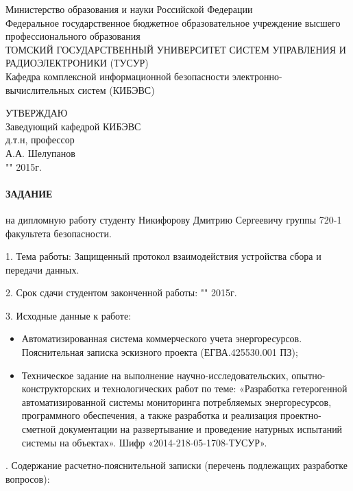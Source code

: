\newpage
{}

\begin{center}
Министерство образования и науки Российской Федерации\\
Федеральное государственное бюджетное образовательное учреждение высшего профессионального образования\\
ТОМСКИЙ ГОСУДАРСТВЕННЫЙ УНИВЕРСИТЕТ СИСТЕМ УПРАВЛЕНИЯ И РАДИОЭЛЕКТРОНИКИ (ТУСУР)\\
Кафедра комплексной информационной безопасности электронно-вычислительных систем (КИБЭВС)\\
\end{center}

\hfill
\begin{minipage}[right]{0.4\linewidth}
\begin{singlespace}
 УТВЕРЖДАЮ \\
 Заведующий кафедрой КИБЭВС \\
 д.т.н, профессор \\
 \underline{\hspace{2.5cm}}А.А. Шелупанов \\
 "\underline{\hspace{1cm}}"\underline{\hspace{3cm}} 2015г.\\
\end{singlespace} 
\end{minipage}

\vspace{1cm}

\paragraph*{\hfill ЗАДАНИЕ \hfill}

на дипломную работу студенту Никифорову Дмитрию Сергеевичу группы 720-1 факультета безопасности.

1. Тема работы: Защищенный протокол взаимодействия устройства сбора и передачи данных.

2. Срок сдачи студентом законченной работы: "\underline{\hspace{1cm}}"\underline{\hspace{3cm}} 2015г.

3. Исходные данные к работе:

\begin{itemize}
 \item Автоматизированная система коммерческого учета энергоресурсов. Пояснительная записка эскизного проекта (ЕГВА.425530.001 ПЗ);
 \item Техническое задание на выполнение научно-исследовательских, опытно-конструкторских и технологических работ по теме: «Разработка гетерогенной автоматизированной системы мониторинга потребляемых энергоресурсов, программного обеспечения, а также разработка и реализация проектно-сметной документации на развертывание и проведение натурных испытаний системы на объектах». Шифр «2014-218-05-1708-ТУСУР».
\end{itemize}
. Содержание расчетно-пояснительной записки (перечень подлежащих разработке вопросов):

